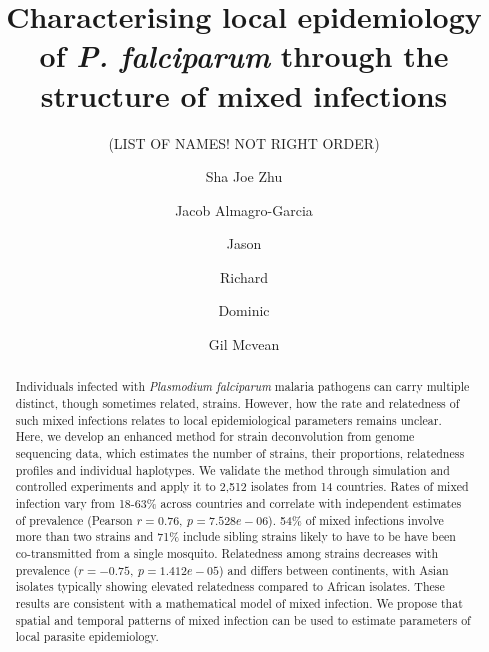 \documentclass[9pt,lineno]{elife}
\newcounter{todocounter}
\newcommand{\done}[2][]
{\todo[color=green!40, #1]{#2}}
\newcommand{\donenum}[2][]
{\stepcounter{todocounter}\done[#1]{\thetodocounter: #2}}
\begin{document}
\title{Characterising local epidemiology of {\it P. falciparum} through the structure of mixed infections}
\newcommand\shorttitle{Mixed infections in malaria}
\date{}

\author{(LIST OF NAMES! NOT RIGHT ORDER)}
\author[1]{Sha Joe Zhu}
\author[1,2,3,4]{Jacob Almagro-Garcia}
\author[1]{Jason}
\author[2,3,4]{Richard}
\author[1,2,3,4]{Dominic}
\author[1,3]{Gil Mcvean}



\maketitle
{}
\listoftodos
{}





\begin{abstract}
Individuals infected with {\it Plasmodium falciparum} malaria pathogens can carry multiple distinct, though sometimes related, strains.  However, how the rate and relatedness of such mixed infections relates to local epidemiological parameters remains unclear.  Here, we develop an enhanced method for strain deconvolution from genome sequencing data, which estimates the number of strains, their proportions, relatedness profiles and individual haplotypes.  We validate the method through simulation and controlled experiments and apply it to 2,512 isolates from 14 countries.  Rates of mixed infection vary from 18-63\% across countries and correlate with independent estimates of prevalence (Pearson $r = 0.76,~p = 7.528e-06$).  54\% of mixed infections involve more than two strains and 71\% include sibling strains likely to have to be have been co-transmitted from a single mosquito.  Relatedness among strains decreases with prevalence ($r = -0.75,~p = 1.412e-05$) and differs between continents, with Asian isolates typically showing elevated relatedness compared to African isolates.  These results are consistent with a mathematical model of mixed infection.  We propose that spatial and temporal patterns of mixed infection can be used to estimate parameters of local parasite epidemiology.
\end{abstract}
\end{document}
